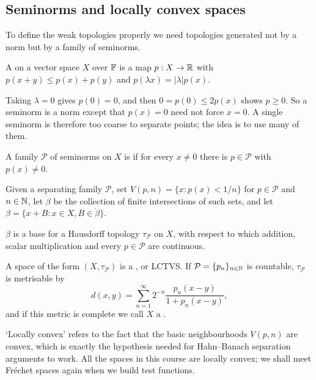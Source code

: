 \documentclass[a4paper]{scrartcl}
\begin{document}
\subsection{Seminorms and locally convex spaces}

To define the weak topologies properly we need topologies generated not by a norm but by a family of seminorms.

\begin{definition}[Seminorm]
	A  on a vector space $X$ over $\mathbb{F}$ is a map $p : X \to \mathbb{R}$ with $p(x+y)\le p(x)+p(y)$ and $p(\lambda x) = |\lambda| p(x)$.
\end{definition}

Taking $\lambda = 0$ gives $p(0) = 0$, and then $0 = p(0) \le 2p(x)$ shows $p \ge 0$. So a seminorm is a norm except that $p(x) = 0$ need not force $x = 0$. A single seminorm is therefore too coarse to separate points; the idea is to use many of them.

\begin{definition}
	A family $\mathcal{P}$ of seminorms on $X$ is  if for every $x \ne 0$ there is $p \in \mathcal{P}$ with $p(x) \ne 0$.
\end{definition}

Given a separating family $\mathcal{P}$, set $V(p,n) = \{x : p(x) < 1/n\}$ for $p \in \mathcal{P}$ and $n \in \mathbb{N}$, let $\dot\beta$ be the collection of finite intersections of such sets, and let $\beta = \{x + B : x \in X, B \in \dot\beta\}$.

\begin{theorem}\label{thm:lctvs}
	$\beta$ is a base for a Hausdorff topology $\tau_{\mathcal{P}}$ on $X$, with respect to which addition, scalar multiplication and every $p \in \mathcal{P}$ are continuous.
\end{theorem}

\begin{definition}
	A space of the form $(X, \tau_\mathcal{P})$ is a , or LCTVS. If $\mathcal{P} = \{p_n\}_{n \in \mathbb{N}}$ is countable, $\tau_\mathcal{P}$ is metrisable by
	$$d(x,y) = \sum_{n=1}^\infty 2^{-n} \frac{p_n(x-y)}{1 + p_n(x-y)},$$
	and if this metric is complete we call $X$ a .
\end{definition}

`Locally convex' refers to the fact that the basic neighbourhoods $V(p,n)$ are convex, which is exactly the hypothesis needed for Hahn--Banach separation arguments to work. All the spaces in this course are locally convex; we shall meet Fr\'echet spaces again when we build test functions.
\end{document}
